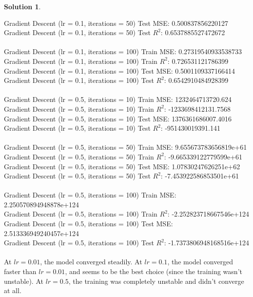 \documentclass[11pt]{article}
\theoremstyle{definition}
\theoremstyle{nopunct}
\newtheorem*{s}{Solution}
\begin{document}
\begin{s}
\begin{enumerate}
        Gradient Descent (lr = 0.1, iterations = 50) Test MSE: 0.500837856220127 \\
        Gradient Descent (lr = 0.1, iterations = 50) Test $R^2$: 0.6537885527472672 \\
        \bigskip \\
        Gradient Descent (lr = 0.1, iterations = 100) Train MSE: 0.27319540933538733 \\
        Gradient Descent (lr = 0.1, iterations = 100) Train $R^2$: 0.726531121786399 \\
        Gradient Descent (lr = 0.1, iterations = 100) Test MSE: 0.5001109337166414 \\
        Gradient Descent (lr = 0.1, iterations = 100) Test $R^2$: 0.6542910484928399 \\
        \bigskip \\
        Gradient Descent (lr = 0.5, iterations = 10) Train MSE: 1232464713720.624 \\
        Gradient Descent (lr = 0.5, iterations = 10) Train $R^2$: -1233698412131.7568 \\
        Gradient Descent (lr = 0.5, iterations = 10) Test MSE: 1376361686007.4016 \\
        Gradient Descent (lr = 0.5, iterations = 10) Test $R^2$: -951430019391.141 \\
        \bigskip \\
        Gradient Descent (lr = 0.5, iterations = 50) Train MSE: 9.655673783656819e+61 \\
        Gradient Descent (lr = 0.5, iterations = 50) Train $R^2$: -9.665339122779599e+61 \\
        Gradient Descent (lr = 0.5, iterations = 50) Test MSE: 1.07830247626251e+62 \\
        Gradient Descent (lr = 0.5, iterations = 50) Test $R^2$: -7.453922586853501e+61 \\
        \bigskip \\
        Gradient Descent (lr = 0.5, iterations = 100) Train MSE: 2.250570894948878e+124 \\
        Gradient Descent (lr = 0.5, iterations = 100) Train $R^2$: -2.252823718667546e+124 \\
        Gradient Descent (lr = 0.5, iterations = 100) Test MSE: 2.513336949240457e+124 \\
        Gradient Descent (lr = 0.5, iterations = 100) Test $R^2$: -1.7373806948168516e+124 \\
        \bigskip \\
        At $lr=0.01$, the model converged steadily. At $lr=0.1$, the model converged faster than $lr=0.01$, and
        seems to be the best choice (since the training wasn't unstable). At $lr=0.5$, the training was completely
        unstable and didn't converge at all.

    \end{enumerate}
\end{s}
\end{document}
